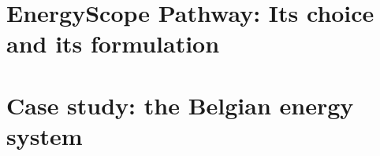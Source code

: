 \documentclass[a4paper,twoside,10pt,final]{memoir} %
\begin{document}






\begin{appendices}

\chapter{EnergyScope Pathway: Its choice and its formulation}
\label{app:EnergyScope}


\chapter{Case study: the Belgian energy system}
\label{app:case_study}




\end{appendices}
\end{document}
